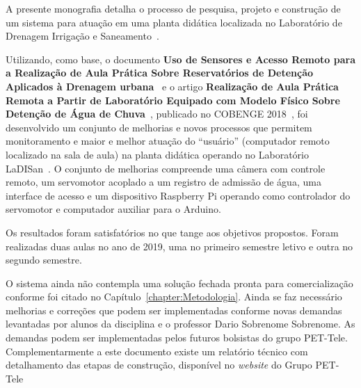 \documentclass[12pt,a4paper,oneside]{book}
\begin{document}
A presente monografia detalha o processo de pesquisa, projeto e construção de um sistema para atuação em uma planta didática localizada no Laboratório de Drenagem Irrigação e Saneamento~\cite{url:ladisan}.

Utilizando, como base, o documento 
\textbf{Uso de Sensores e Acesso Remoto para a Realização de Aula Prática Sobre Reservatórios de Detenção Aplicados à Drenagem urbana}~\cite{article:tcc_lorraine_maria} 
%
e o artigo 
\textbf{Realização de Aula Prática Remota a Partir de Laboratório Equipado com Modelo Físico Sobre Detenção de Água de Chuva}~\cite{article:lorraine_maria}, 
publicado no COBENGE 2018~\cite{url:cobenge}, 
%
foi desenvolvido um conjunto de melhorias e novos processos que permitem monitoramento e maior e melhor atuação do ``usuário'' (computador remoto localizado na sala de aula) na planta didática operando no Laboratório LaDISan~\cite{url:ladisan}. 
%
O conjunto de melhorias compreende uma câmera com controle remoto, um servomotor acoplado a um registro de admissão de água, uma interface de acesso e um dispositivo Raspberry Pi operando como controlador do servomotor e computador auxiliar para o Arduino. 

Os resultados foram satisfatórios no que tange aos objetivos propostos. 
Foram realizadas duas aulas no ano de 2019, uma no primeiro semestre letivo e outra no segundo semestre.

O sistema ainda não contempla uma solução fechada pronta para comercialização conforme foi citado no Capítulo~\ref{chapter:Metodologia}.
%
Ainda se faz necessário melhorias e correções que podem ser implementadas conforme novas demandas levantadas por alunos da disciplina e o professor Dario Sobrenome Sobrenome.
%
As demandas podem ser implementadas pelos futuros bolsistas do grupo PET-Tele. Complementarmente a este documento existe um relatório técnico com detalhamento das etapas de construção, disponível no \textit{website} do Grupo PET-Tele~\cite{url:projeto_ladisan}

\end{document}
